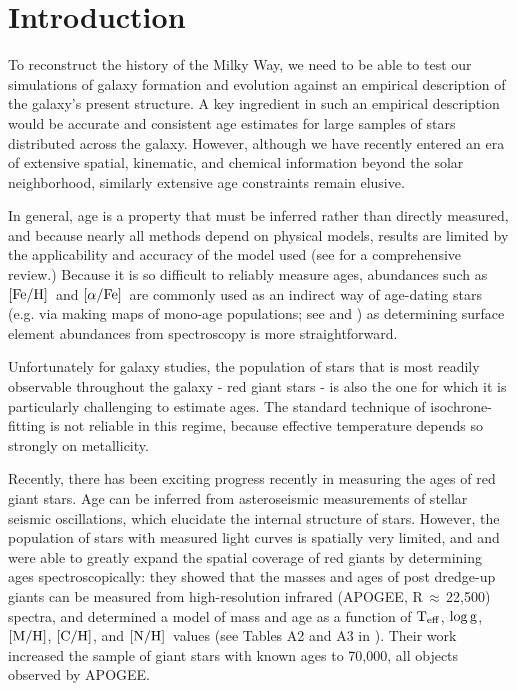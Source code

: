 \documentclass[12pt, preprint]{aastex}
\newcommand{\apogee}{APOGEE}
\newcommand{\teff}{\mbox{$\rm T_{eff}$}}
\newcommand{\logg}{\mbox{$\rm \log g$}}
\newcommand{\mh}{\mbox{$\rm [M/H]$}}
\newcommand{\feh}{\mbox{$\rm [Fe/H]$}}
\newcommand{\afe}{\mbox{$\rm [\alpha/Fe]$}}
\newcommand{\carbon}{\mbox{$\rm [C/H]$}}
\newcommand{\nitrogen}{\mbox{$\rm [N/H]$}}
\begin{document}
\section{Introduction}

To reconstruct the history of the Milky Way,
we need to be able to test our simulations of galaxy formation
and evolution against an empirical description of the galaxy's present 
structure.
A key ingredient in such an empirical description would be accurate and
consistent age estimates for large samples of stars distributed
across the galaxy. However, although we have recently entered
an era of extensive spatial, kinematic, and chemical
information beyond the solar neighborhood, similarly extensive 
age constraints remain elusive.

In general, age is a property that must be
inferred rather than directly measured, 
and because nearly all methods depend on physical models, 
results are limited by the applicability and accuracy of the model used
(see \citet{Soderblom2010} for a comprehensive review.)
Because it is so difficult to reliably measure ages,
abundances such as \feh\ and \afe\ are commonly used as an 
indirect way of age-dating stars 
(e.g. via making maps of mono-age populations; 
see \cite{RixBovy2013} and \cite{Bovy2015}) 
as determining surface element abundances from spectroscopy
is more straightforward.

Unfortunately for galaxy studies,
the population of stars that is most readily observable throughout the
galaxy - red giant stars - is also the one for which it is particularly
challenging to estimate ages.
The standard technique of isochrone-fitting is not reliable in this regime,
because effective temperature depends so strongly on metallicity.

Recently, there has been exciting progress recently in measuring 
the ages of red giant stars. Age can be inferred from asteroseismic
measurements of stellar seismic oscillations, 
which elucidate the internal structure of stars. 
However, the population of stars with measured light curves is
spatially very limited, and \citet{Ness2016} and \citet{Martig2016}
were able to greatly expand the spatial coverage of red giants by
determining ages spectroscopically:
they showed that the masses
and ages of post dredge-up giants can be measured from 
high-resolution infrared (\apogee, R\,$\approx\,$22,500) spectra, and
determined a model of mass and age as a function of 
\teff, \logg, \mh, \carbon, and \nitrogen\ values 
(see Tables A2 and A3 in \citet{Martig2016}).
Their work increased the sample of giant stars with known ages
to 70,000, all objects observed by \apogee.
\end{document}
